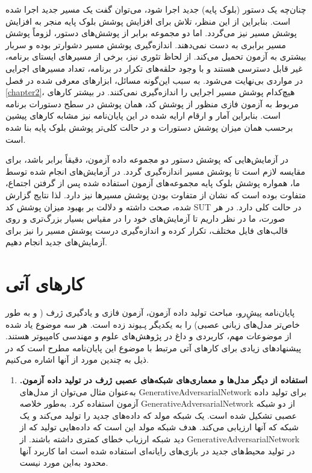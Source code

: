 {چنان‌چه یک دستور (بلوک پایه) جدید اجرا شود، می‌توان گفت یک مسیر جدید اجرا شده است. بنابراین از این منظر، تلاش برای افزایش پوشش بلوک پایه منجر به افزایش پوشش مسیر نیز می‌گردد. اما دو مجموعه برابر از پوشش‌های دستور، لزوماً پوشش مسیر برابری به ‌دست نمی‌دهند. اندازه‌گیری پوشش مسیر دشوار‌تر بوده و سربار بیشتری به آزمون تحمیل می‌کند. از لحاظ تئوری نیز، برخی از مسیرهای ایستای برنامه، غیر قابل دسترسی هستند و با وجود حلقه‌های تکرار در برنامه، تعداد مسیرهای اجرایی در مواردی بی‌نهایت می‌شود. به سبب این‌گونه مسائل، ابزارهای معرفی شده در فصل \ref{chapter2}، هیچ‌کدام پوشش مسیر اجرایی را اندازه‌گیری نمی‌کنند. در بیشتر کارهای مربوط به آزمون فازی منظور از پوشش کد، همان پوشش در سطح دستورات برنامه است. بنابراین آمار و ارقام ارایه شده در این پایان‌نامه نیز مشابه کارهای پیشین برحسب همان میزان پوشش دستورات و در حالت کلی‌تر پوشش بلوک پایه بنا شده است. 

در آزمایش‌هایی که پوشش دستور دو مجموعه داده آزمون، دقیقاً برابر باشد، برای مقایسه لازم است تا پوشش مسیر اندازه‌گیری گردد. در آزمایش‌های انجام شده توسط ما، همواره پوشش بلوک پایه مجموعه‌های آزمون استفاده شده پس از گرفتن اجتماع، متفاوت بوده است که نشان از متفاوت بودن پوشش مسیر‌ها نیز دارد. لذا نتایج گزارش شده، صحت داشته و دلالت بر بهبود میزان پوشش کد 
\gls{SUT}
در حالت کلی دارد. در هر صورت، ما در نظر داریم تا آزمایش‌های خود را در مقیاس بسیار بزرگ‌تری و روی قالب‌های فایل مختلف، تکرار کرده و اندازه‌گیری درست پوشش مسیر را نیز برای آزمایش‌های جدید انجام دهیم.   


\section{کارهای آتی}
پایان‌نامه پیش‌ِرو، مباحث تولید داده آزمون، آزمون فازی و یادگیری ژرف ( و به طور خاص‌تر مدل‌های زبانی عصبی) را به یکدیگر پـیوند زده است. هر سه موضوع یاد شده از موضوعات مهم، کاربردی و داغ در پژوهش‌های علوم و مهندسی کامپیوتر هستند. پیشنهادهای زیادی برای کارهای آتی مرتبط با موضوع این پایان‌نامه مطرح است که در ذیل به چندین مورد از آنها اشاره می‌کنیم.

\begin{enumerate}
	\item{
		\textbf{استفاده از دیگر مدل‌ها و معماری‌های شبکه‌های عصبی ژرف در تولید داده آزمون. }
		به‌عنوان مثال می‌توان از مدل‌های
		 \gls{GenerativeAdversarialNetwork} \cite{NIPS2014_5423}
		  برای تولید داده آزمون استفاده کرد. به‌طور خلاصه
		 \gls{GenerativeAdversarialNetwork}
		  از دو شبکه عصبی تشکیل شده است. یک شبکه مولد که داده‌های جدید را تولید می‌کند و یک شبکه که آنها ارزیابی می‌کند. هدف شبکه مولد این است که داده‌هایی تولید که از دید شبکه ارزیاب خطای کمتری داشته باشند. از \gls{GenerativeAdversarialNetwork} در تولید محیط‌های جدید در بازی‌های رایانه‌ای استفاده شده‌ است اما کاربرد آنها محدود به‌این مورد نیست. 
	
}
\end{enumerate}}
